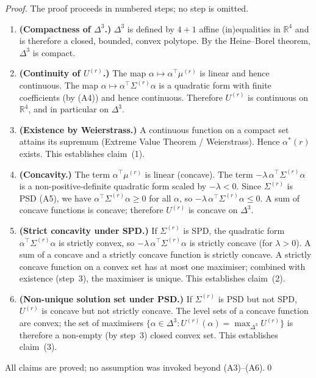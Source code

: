 \documentclass[12pt,openany]{book}
\newcommand{\R}{\mathbb{R}}
\numberwithin{equation}{chapter}
\theoremstyle{plain}
\theoremstyle{definition}
\theoremstyle{remark}
\numberwithin{equation}{chapter}
\theoremstyle{plain}
\begin{document}
\begin{proof}
The proof proceeds in numbered steps; no step is omitted.

\begin{enumerate}
  \item \textbf{(Compactness of $\Delta^{3}$.)}
        $\Delta^{3}$ is defined by $4 + 1$ affine (in)equalities in $\R^4$
        and is therefore a closed, bounded, convex polytope.  By the
        Heine--Borel theorem, $\Delta^{3}$ is compact.

  \item \textbf{(Continuity of $U^{(r)}$.)}
        The map $\alpha \mapsto \alpha^\top \mu^{(r)}$ is linear and
        hence continuous.  The map $\alpha \mapsto \alpha^\top
        \Sigma^{(r)} \alpha$ is a quadratic form with finite coefficients
        (by (A4)) and hence continuous.  Therefore $U^{(r)}$ is
        continuous on $\R^4$, and in particular on $\Delta^{3}$.

  \item \textbf{(Existence by Weierstrass.)}
        A continuous function on a compact set attains its supremum
        (Extreme Value Theorem / Weierstrass).  Hence $\alpha^{*}(r)$
        exists.  This establishes claim~(1).

  \item \textbf{(Concavity.)}
        The term $\alpha^\top \mu^{(r)}$ is linear (concave).
        The term $-\lambda\,\alpha^\top \Sigma^{(r)}\alpha$ is a
        non-positive-definite quadratic form scaled by $-\lambda < 0$.
        Since $\Sigma^{(r)}$ is PSD (A5), we have
        $\alpha^\top \Sigma^{(r)}\alpha \geq 0$ for all $\alpha$, so
        $-\lambda\,\alpha^\top \Sigma^{(r)}\alpha \leq 0$.
        A sum of concave functions is concave; therefore $U^{(r)}$ is
        concave on $\Delta^{3}$.

  \item \textbf{(Strict concavity under SPD.)}
        If $\Sigma^{(r)}$ is SPD, the quadratic form
        $\alpha^\top \Sigma^{(r)}\alpha$ is strictly convex, so
        $-\lambda\,\alpha^\top\Sigma^{(r)}\alpha$ is strictly concave
        (for $\lambda > 0$).  A sum of a concave and a strictly concave
        function is strictly concave.  A strictly concave function on a
        convex set has at most one maximiser; combined with existence
        (step~3), the maximiser is unique.  This establishes claim~(2).

  \item \textbf{(Non-unique solution set under PSD.)}
        If $\Sigma^{(r)}$ is PSD but not SPD, $U^{(r)}$ is concave but
        not strictly concave.  The level sets of a concave function are
        convex; the set of maximisers $\{\alpha \in \Delta^3 :
        U^{(r)}(\alpha) = \max_{\Delta^3} U^{(r)}\}$ is therefore a
        non-empty (by step~3) closed convex set.  This establishes
        claim~(3).
\end{enumerate}

\noindent All claims are proved; no assumption was invoked beyond
(A3)--(A6).\qed
\end{proof}
\end{document}
